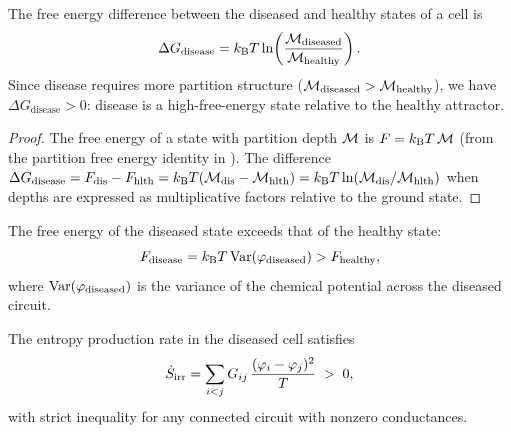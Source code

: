 \begin{theorem}
\label{thm:stellas}
The free energy difference between the diseased and healthy states of a
cell is
\begin{equation}
  \Delta G_{\mathrm{disease}}
  = k_{\mathrm{B}} T \ln\!\left(\frac{\mathcal{M}_{\mathrm{diseased}}}{\mathcal{M}_{\mathrm{healthy}}}\right).
  \label{eq:stellas}
\end{equation}
Since disease requires more partition structure ($\mathcal{M}_{\mathrm{diseased}} >
\mathcal{M}_{\mathrm{healthy}}$), we have $\Delta G_{\mathrm{disease}} > 0$:
disease is a high-free-energy state relative to the healthy attractor.
\end{theorem}

\begin{proof}
The free energy of a state with partition depth $\mathcal{M}$ is
$F = k_{\mathrm{B}} T\,\mathcal{M}$ (from the partition free energy identity in
).  The difference $\Delta G_{\mathrm{disease}} =
F_{\mathrm{dis}} - F_{\mathrm{hlth}} = k_{\mathrm{B}} T(\mathcal{M}_{\mathrm{dis}} - \mathcal{M}_{\mathrm{hlth}}) =
k_{\mathrm{B}} T \ln(\mathcal{M}_{\mathrm{dis}}/\mathcal{M}_{\mathrm{hlth}})$ when depths are expressed
as multiplicative factors relative to the ground state.
\end{proof}

\begin{corollary}
\label{cor:high-entropy}
The free energy of the diseased state exceeds that of the healthy state:
\begin{equation}
  F_{\mathrm{disease}}
  = k_{\mathrm{B}} T\,\mathrm{Var}(\varphi_{\mathrm{diseased}})
  > F_{\mathrm{healthy}},
  \label{eq:disease-free-energy}
\end{equation}
where $\mathrm{Var}(\varphi_{\mathrm{diseased}})$ is the variance of
the chemical potential across the diseased circuit.
\end{corollary}

\begin{theorem}
\label{thm:entropy-production}
The entropy production rate in the diseased cell satisfies
\begin{equation}
  \dot{S}_{\mathrm{irr}}
  = \sum_{i < j} G_{ij}\,
    \frac{(\varphi_i - \varphi_j)^2}{T}
  \;>\; 0,
  \label{eq:entropy-production}
\end{equation}
with strict inequality for any connected circuit with nonzero conductances.
\end{theorem}

